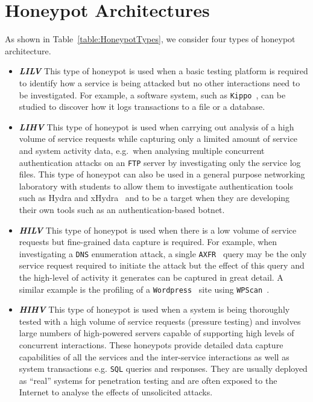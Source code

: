 \documentclass{ieeeaccess}
\begin{document}
\section{Honeypot Architectures}\label{sec:HoneyArch}

As shown in Table~\ref{table:HoneypotTypes}, we consider four types 
of honeypot architecture.

\begin{itemize}

  \item \noindent \emph{\textbf{LILV}} This type of honeypot is used when a
    basic testing platform is required to identify how a service is being
    attacked but no other interactions need to be investigated. For example, a
    software system, such as \texttt{Kippo}~\cite{SH:15}, can be studied to
    discover how it logs transactions to a file or a database. 

  \item \noindent \emph{\textbf{LIHV}} This type of honeypot is used when
    carrying out analysis of a high volume of service requests while capturing
    only a limited amount of service and system activity data, e.g.\ when
    analysing multiple concurrent authentication attacks on an
    \texttt{FTP} server by investigating only the service log files. This type of
    honeypot can also be used in a general purpose networking laboratory with
    students to allow them to investigate authentication tools such as Hydra
    and xHydra~\cite{RS:15} and to be a target when they are developing their
    own tools such as an authentication-based botnet.

  \item \noindent \emph{\textbf{HILV}} This type of honeypot is used when there
    is a low volume of service requests but fine-grained data capture is
    required. For example, when investigating a \texttt{DNS} enumeration
    attack, a single \texttt{AXFR}~\cite{EL:10} query may be the only service
    request required to initiate the attack but the effect of this query and
    the high-level of activity it generates can be captured in great detail.  A
    similar example is the profiling of a \texttt{Wordpress}~\cite{WP:17} site
    using \texttt{WPScan}~\cite{WT:17}.

  \item \noindent \emph{\textbf{HIHV}} This type of honeypot is used when a
    system is being thoroughly tested with a high volume of service requests
    (pressure testing) and involves large numbers of high-powered servers capable
    of supporting high levels of concurrent interactions. These honeypots
    provide detailed data capture capabilities of all the services and the
    inter-service interactions as well as system transactions e.g. \texttt{SQL}
    queries and responses. They are usually deployed as ``real'' systems for
    penetration testing and are often exposed to the Internet to analyse the
    effects of unsolicited attacks.  

\end{itemize}
\end{document}
